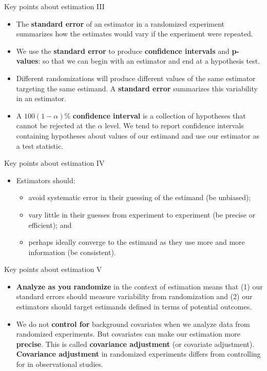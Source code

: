 \documentclass[
  ignorenonframetext,
]{beamer}
\begin{document}
\begin{frame}{Key points about estimation III}
\protect\hypertarget{key-points-about-estimation-iii}{}
\begin{itemize}
\item
  The \textbf{standard error} of an estimator in a randomized experiment
  summarizes how the estimates would vary if the experiment were
  repeated.
\item
  We use the \textbf{standard error} to produce \textbf{confidence
  intervals} and \textbf{p-values}: so that we can begin with an
  estimator and end at a hypothesis test.
\item
  Different randomizations will produce different values of the same
  estimator targeting the same estimand. A \textbf{standard error}
  summarizes this variability in an estimator.
\item
  A \(100(1-\alpha)\)\% \textbf{confidence interval} is a collection of
  hypotheses that cannot be rejected at the \(\alpha\) level. We tend to
  report confidence intervals containing hypotheses about values of our
  estimand and use our estimator as a test statistic.
\end{itemize}
\end{frame}

\begin{frame}{Key points about estimation IV}
\protect\hypertarget{key-points-about-estimation-iv}{}
\begin{itemize}
\item
  Estimators should:

  \begin{itemize}
  \item
    avoid systematic error in their guessing of the estimand (be
    unbiased);
  \item
    vary little in their guesses from experiment to experiment (be
    precise or efficient); and
  \item
    perhaps ideally converge to the estimand as they use more and more
    information (be consistent).
  \end{itemize}
\end{itemize}
\end{frame}

\begin{frame}{Key points about estimation V}
\protect\hypertarget{key-points-about-estimation-v}{}
\begin{itemize}
\item
  \textbf{Analyze as you randomize} in the context of estimation means
  that (1) our standard errors should measure variability from
  randomization and (2) our estimators should target estimands defined
  in terms of potential outcomes.
\item
  We do not \textbf{control for} background covariates when we analyze
  data from randomized experiments. But covariates can make our
  estimation more \textbf{precise}. This is called \textbf{covariance
  adjustment} (or covariate adjustment). \textbf{Covariance adjustment}
  in randomized experiments differs from controlling for in
  observational studies.
\end{itemize}
\end{frame}
\end{document}
